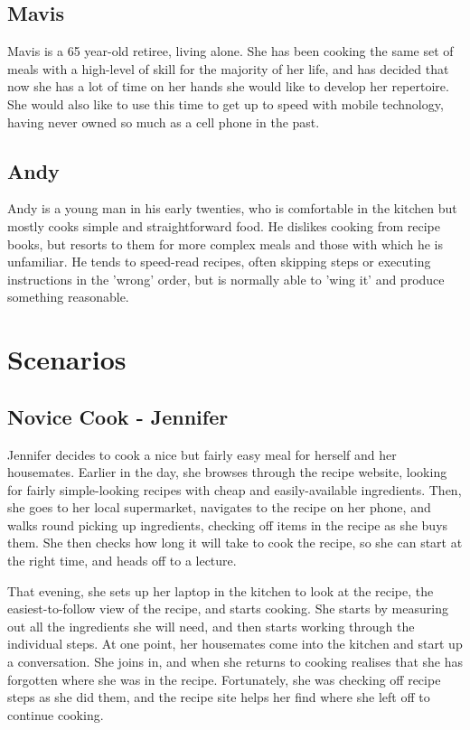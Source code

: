 \documentclass{article}
\begin{document}
\subsection*{Mavis}
Mavis is a 65 year-old retiree, living alone. She has been cooking the same set 
of meals with a high-level of skill for the majority of her life, and has
decided that now she has a lot of time on her hands she would like to develop
her repertoire. She would also like to use this time to get up to speed with 
mobile technology, having never owned so much as a cell phone in the past.

\subsection*{Andy}
Andy is a young man in his early twenties, who is comfortable in the kitchen but
mostly cooks simple and straightforward food. He dislikes cooking from recipe
books, but resorts to them for more complex meals and those with which he is
unfamiliar. He tends to speed-read recipes, often skipping steps or executing
instructions in the 'wrong' order, but is normally able to 'wing it' and produce
something reasonable.

\clearpage

\section*{Scenarios}
\subsection*{Novice Cook - Jennifer}
Jennifer decides to cook a nice but fairly easy meal for herself and her 
housemates. Earlier in the day, she browses through the recipe website, looking
for fairly simple-looking recipes with cheap and easily-available ingredients.
Then, she goes to her local supermarket, navigates to the recipe on her phone,
and walks round picking up ingredients, checking off items in the recipe as she
buys them. She then checks how long it will take to cook the recipe, so she can
start at the right time, and heads off to a lecture.

That evening, she sets up her laptop in the kitchen to look at the recipe,
the easiest-to-follow view of the recipe, and starts cooking. She starts by 
measuring out all the ingredients she will need, and then starts working through
the individual steps. At one point, her housemates come into the kitchen and 
start up a conversation. She joins in, and when she returns to cooking realises
that she has forgotten where she was in the recipe. Fortunately, she was
checking off recipe steps as she did them, and the recipe site helps her find
where she left off to continue cooking.
\end{document}
